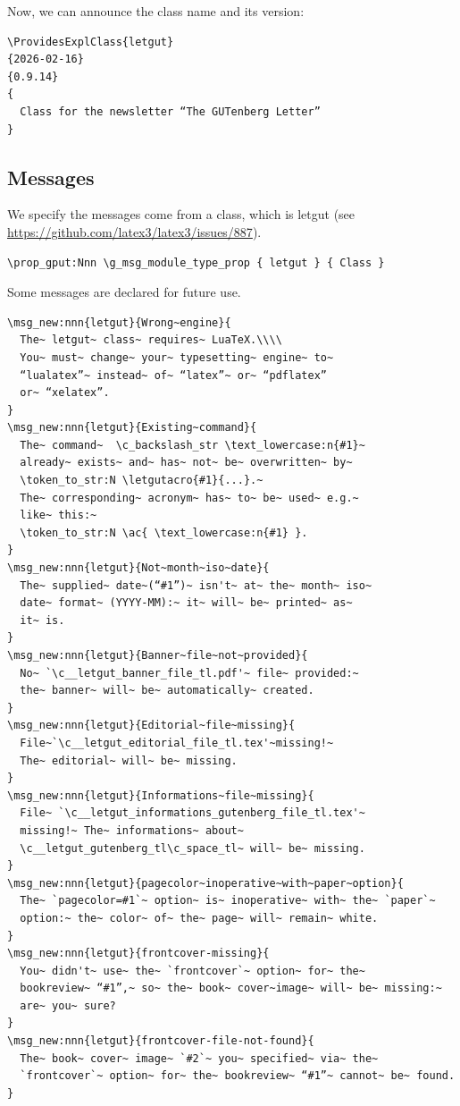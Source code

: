 \documentclass{letgut}
\begin{document}
Now, we can announce the class name and its version:

\begin{lstlisting}
\ProvidesExplClass{letgut}
{2026-02-16}
{0.9.14}
{
  Class for the newsletter “The GUTenberg Letter”
}
\end{lstlisting}
\subsection{Messages}
\label{ImplementationMessages-xg7g55h0jlj0}
We specify the messages come from a class, which is letgut (see
\url{https://github.com/latex3/latex3/issues/887}).

\begin{lstlisting}
\prop_gput:Nnn \g_msg_module_type_prop { letgut } { Class }
\end{lstlisting}

Some messages are declared for future use.

\begin{lstlisting}
\msg_new:nnn{letgut}{Wrong~engine}{
  The~ letgut~ class~ requires~ LuaTeX.\\\\
  You~ must~ change~ your~ typesetting~ engine~ to~
  “lualatex”~ instead~ of~ “latex”~ or~ “pdflatex”
  or~ “xelatex”.
}
\msg_new:nnn{letgut}{Existing~command}{
  The~ command~  \c_backslash_str \text_lowercase:n{#1}~
  already~ exists~ and~ has~ not~ be~ overwritten~ by~
  \token_to_str:N \letgutacro{#1}{...}.~
  The~ corresponding~ acronym~ has~ to~ be~ used~ e.g.~
  like~ this:~
  \token_to_str:N \ac{ \text_lowercase:n{#1} }.
}
\msg_new:nnn{letgut}{Not~month~iso~date}{
  The~ supplied~ date~(“#1”)~ isn't~ at~ the~ month~ iso~
  date~ format~ (YYYY-MM):~ it~ will~ be~ printed~ as~
  it~ is.
}
\msg_new:nnn{letgut}{Banner~file~not~provided}{
  No~ `\c__letgut_banner_file_tl.pdf'~ file~ provided:~
  the~ banner~ will~ be~ automatically~ created.
}
\msg_new:nnn{letgut}{Editorial~file~missing}{
  File~`\c__letgut_editorial_file_tl.tex'~missing!~
  The~ editorial~ will~ be~ missing.
}
\msg_new:nnn{letgut}{Informations~file~missing}{
  File~ `\c__letgut_informations_gutenberg_file_tl.tex'~
  missing!~ The~ informations~ about~
  \c__letgut_gutenberg_tl\c_space_tl~ will~ be~ missing.
}
\msg_new:nnn{letgut}{pagecolor~inoperative~with~paper~option}{
  The~ `pagecolor=#1`~ option~ is~ inoperative~ with~ the~ `paper`~
  option:~ the~ color~ of~ the~ page~ will~ remain~ white.
}
\msg_new:nnn{letgut}{frontcover-missing}{
  You~ didn't~ use~ the~ `frontcover`~ option~ for~ the~
  bookreview~ “#1”,~ so~ the~ book~ cover~image~ will~ be~ missing:~
  are~ you~ sure?
}
\msg_new:nnn{letgut}{frontcover-file-not-found}{
  The~ book~ cover~ image~ `#2`~ you~ specified~ via~ the~
  `frontcover`~ option~ for~ the~ bookreview~ “#1”~ cannot~ be~ found.
}
\end{lstlisting}
\end{document}
